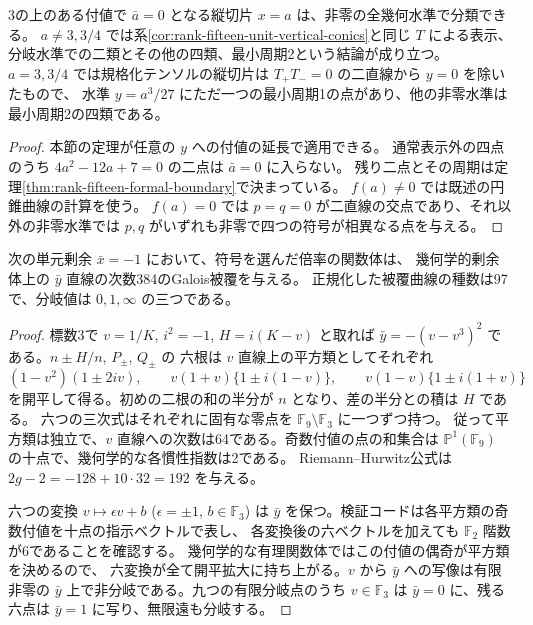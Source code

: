 \begin{corollary}
3の上のある付値で $\bar a=0$ となる縦切片 $x=a$ は、非零の全幾何水準で分類できる。
$a\ne3,3/4$ では系\ref{cor:rank-fifteen-unit-vertical-conics}と同じ $T$ による表示、
分岐水準での二類とその他の四類、最小周期2という結論が成り立つ。
$a=3,3/4$ では規格化テンソルの縦切片は $T_+T_-=0$ の二直線から $y=0$ を除いたもので、
水準 $y=a^3/27$ にただ一つの最小周期1の点があり、他の非零水準は最小周期2の四類である。
\end{corollary}
\begin{proof}
本節の定理が任意の $y$ への付値の延長で適用できる。
通常表示外の四点のうち $4a^2-12a+7=0$ の二点は $\bar a=0$ に入らない。
残り二点とその周期は定理\ref{thm:rank-fifteen-formal-boundary}で決まっている。
$f(a)\ne0$ では既述の円錐曲線の計算を使う。
$f(a)=0$ では $p=q=0$ が二直線の交点であり、それ以外の非零水準では
$p,q$ がいずれも非零で四つの符号が相異なる点を与える。
\end{proof}

\begin{lemma}\label{lem:rank-fifteen-negative-unit-cover}
次の単元剰余 $\bar x=-1$ において、符号を選んだ倍率の関数体は、
幾何学的剰余体上の $\bar y$ 直線の次数384のGalois被覆を与える。
正規化した被覆曲線の種数は97で、分岐値は $0,1,\infty$ の三つである。
\end{lemma}
\begin{proof}
標数3で $v=1/K$, $i^2=-1$, $H=i(K-v)$ と取れば
$\bar y=-(v-v^3)^2$ である。$n\pm H/n$, $P_\pm$, $Q_\pm$ の
六根は $v$ 直線上の平方類としてそれぞれ
\[
 (1-v^2)(1\pm2iv),\qquad
 v(1+v)\{1\pm i(1-v)\},\qquad
 v(1-v)\{1\pm i(1+v)\}
\]
を開平して得る。初めの二根の和の半分が $n$ となり、差の半分との積は $H$ である。
六つの三次式はそれぞれに固有な零点を $\mathbb F_9\setminus\mathbb F_3$ に一つずつ持つ。
従って平方類は独立で、$v$ 直線への次数は64である。奇数付値の点の和集合は
$\mathbb P^1(\mathbb F_9)$ の十点で、幾何学的な各慣性指数は2である。
Riemann--Hurwitz公式は $2g-2=-128+10\cdot32=192$ を与える。

六つの変換 $v\mapsto\epsilon v+b$ ($\epsilon=\pm1$, $b\in\mathbb F_3$) は
$\bar y$ を保つ。検証コードは各平方類の奇数付値を十点の指示ベクトルで表し、
各変換後の六ベクトルを加えても $\mathbb F_2$ 階数が6であることを確認する。
幾何学的な有理関数体ではこの付値の偶奇が平方類を決めるので、
六変換が全て開平拡大に持ち上がる。$v$ から $\bar y$ への写像は有限非零の
$\bar y$ 上で非分岐である。九つの有限分岐点のうち $v\in\mathbb F_3$ は
$\bar y=0$ に、残る六点は $\bar y=1$ に写り、無限遠も分岐する。
\end{proof}
